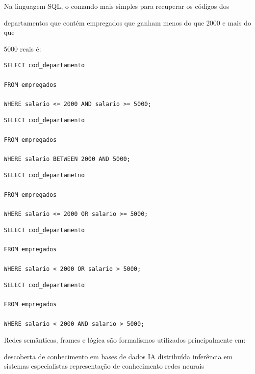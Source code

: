 \documentclass[12pt, addpoints]{exam}
\begin{document}
\begin{questions}
\vspace{-0.4cm}

Na linguagem SQL, o comando mais simples para recuperar os códigos dos

departamentos que contém empregados que ganham menos do que 2000 e mais do que

5000 reais é:


\begin{choices}
\choice \begin{verbatim}SELECT cod_departamento

FROM empregados

WHERE salario <= 2000 AND salario >= 5000;

\end{verbatim}


\choice \begin{verbatim}SELECT cod_departamento

FROM empregados

WHERE salario BETWEEN 2000 AND 5000;

\end{verbatim}


\choice \begin{verbatim}SELECT cod_departametno

FROM empregados

WHERE salario <= 2000 OR salario >= 5000;

\end{verbatim}


\choice \begin{verbatim}SELECT cod_departamento

FROM empregados

WHERE salario < 2000 OR salario > 5000;

\end{verbatim}


\choice \begin{verbatim}SELECT cod_departamento

FROM empregados

WHERE salario < 2000 AND salario > 5000;

\end{verbatim}


\end{choices}

\question

Redes semânticas, frames e lógica são formalismos utilizados principalmente em: 
\begin{choices}
\choice descoberta de conhecimento em bases de dados
\choice IA distribuída
\choice inferência em sistemas especialistas
\choice representação de conhecimento
\choice redes neurais
\end{choices}


\end{questions}
\end{document}
